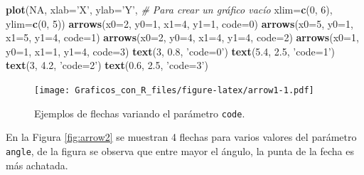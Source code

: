 \documentclass[10pt,]{krantz}
\makeatletter
\newenvironment{Shaded}{\begin{snugshade}}{\end{snugshade}}
\newcommand{\KeywordTok}[1]{\textcolor[rgb]{0.13,0.29,0.53}{\textbf{#1}}}
\newcommand{\DataTypeTok}[1]{\textcolor[rgb]{0.13,0.29,0.53}{#1}}
\newcommand{\DecValTok}[1]{\textcolor[rgb]{0.00,0.00,0.81}{#1}}
\newcommand{\FloatTok}[1]{\textcolor[rgb]{0.00,0.00,0.81}{#1}}
\newcommand{\StringTok}[1]{\textcolor[rgb]{0.31,0.60,0.02}{#1}}
\newcommand{\CommentTok}[1]{\textcolor[rgb]{0.56,0.35,0.01}{\textit{#1}}}
\newcommand{\OtherTok}[1]{\textcolor[rgb]{0.56,0.35,0.01}{#1}}
\newcommand{\NormalTok}[1]{#1}
\newenvironment{kframe}{%
\medskip{}
\setlength{\fboxsep}{.8em}
 \def\at@end@of@kframe{}%
 \ifinner\ifhmode%
  \def\at@end@of@kframe{\end{minipage}}%
  \begin{minipage}{\columnwidth}%
 \fi\fi%
 \def\FrameCommand##1{\hskip\@totalleftmargin \hskip-\fboxsep
 \colorbox{shadecolor}{##1}\hskip-\fboxsep
     \hskip-\linewidth \hskip-\@totalleftmargin \hskip\columnwidth}%
 \MakeFramed {\advance\hsize-\width
   \@totalleftmargin\z@ \linewidth\hsize
   \@setminipage}}%
 {\par\unskip\endMakeFramed%
 \at@end@of@kframe}
\renewenvironment{Shaded}{\begin{kframe}}{\end{kframe}}
\makeatother
\begin{document}
\begin{Shaded}
\begin{Highlighting}[]
\KeywordTok{plot}\NormalTok{(}\OtherTok{NA}\NormalTok{, }\DataTypeTok{xlab=}\StringTok{'X'}\NormalTok{, }\DataTypeTok{ylab=}\StringTok{'Y'}\NormalTok{,      }\CommentTok{# Para crear un gráfico vacío}
     \DataTypeTok{xlim=}\KeywordTok{c}\NormalTok{(}\DecValTok{0}\NormalTok{, }\DecValTok{6}\NormalTok{), }\DataTypeTok{ylim=}\KeywordTok{c}\NormalTok{(}\DecValTok{0}\NormalTok{, }\DecValTok{5}\NormalTok{))}
\KeywordTok{arrows}\NormalTok{(}\DataTypeTok{x0=}\DecValTok{2}\NormalTok{, }\DataTypeTok{y0=}\DecValTok{1}\NormalTok{, }\DataTypeTok{x1=}\DecValTok{4}\NormalTok{, }\DataTypeTok{y1=}\DecValTok{1}\NormalTok{, }\DataTypeTok{code=}\DecValTok{0}\NormalTok{)}
\KeywordTok{arrows}\NormalTok{(}\DataTypeTok{x0=}\DecValTok{5}\NormalTok{, }\DataTypeTok{y0=}\DecValTok{1}\NormalTok{, }\DataTypeTok{x1=}\DecValTok{5}\NormalTok{, }\DataTypeTok{y1=}\DecValTok{4}\NormalTok{, }\DataTypeTok{code=}\DecValTok{1}\NormalTok{)}
\KeywordTok{arrows}\NormalTok{(}\DataTypeTok{x0=}\DecValTok{2}\NormalTok{, }\DataTypeTok{y0=}\DecValTok{4}\NormalTok{, }\DataTypeTok{x1=}\DecValTok{4}\NormalTok{, }\DataTypeTok{y1=}\DecValTok{4}\NormalTok{, }\DataTypeTok{code=}\DecValTok{2}\NormalTok{)}
\KeywordTok{arrows}\NormalTok{(}\DataTypeTok{x0=}\DecValTok{1}\NormalTok{, }\DataTypeTok{y0=}\DecValTok{1}\NormalTok{, }\DataTypeTok{x1=}\DecValTok{1}\NormalTok{, }\DataTypeTok{y1=}\DecValTok{4}\NormalTok{, }\DataTypeTok{code=}\DecValTok{3}\NormalTok{)}
\KeywordTok{text}\NormalTok{(}\DecValTok{3}\NormalTok{, }\FloatTok{0.8}\NormalTok{, }\StringTok{'code=0'}\NormalTok{)}
\KeywordTok{text}\NormalTok{(}\FloatTok{5.4}\NormalTok{, }\FloatTok{2.5}\NormalTok{, }\StringTok{'code=1'}\NormalTok{)}
\KeywordTok{text}\NormalTok{(}\DecValTok{3}\NormalTok{, }\FloatTok{4.2}\NormalTok{, }\StringTok{'code=2'}\NormalTok{)}
\KeywordTok{text}\NormalTok{(}\FloatTok{0.6}\NormalTok{, }\FloatTok{2.5}\NormalTok{, }\StringTok{'code=3'}\NormalTok{)}
\end{Highlighting}
\end{Shaded}

\begin{figure}
\centering
\texttt{[image: Graficos\_con\_R\_files/figure-latex/arrow1-1.pdf]}
\caption{\label{fig:arrow1}Ejemplos de flechas variando el parámetro
\texttt{code}.}
\end{figure}

En la Figura \ref{fig:arrow2} se muestran 4 flechas para varios valores
del parámetro \texttt{angle}, de la figura se observa que entre mayor el
ángulo, la punta de la fecha es más achatada.
\end{document}

